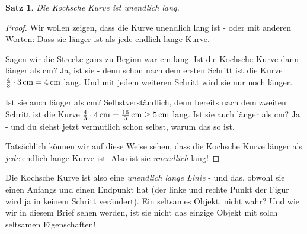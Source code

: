 \documentclass[a4paper,ngerman,12pt]{scrartcl}
\theoremstyle{definition}
\theoremstyle{plain}
\newtheorem{satz}[defn]{Satz}
\theoremstyle{remark}
\begin{document}
\begin{satz}\label{satz:Kochkurve_laenge}
Die Kochsche Kurve ist unendlich lang.
\end{satz} 

\begin{proof}
Wir wollen zeigen, dass die Kurve unendlich lang ist - oder mit anderen Worten: Dass sie länger ist als jede endlich lange Kurve.

Sagen wir die Strecke ganz zu Beginn war \unit[3]{cm} lang. Ist die Kochsche Kurve dann länger als \unit[4]{cm}? Ja, ist sie - denn schon nach dem ersten Schritt ist die Kurve $\frac{4}{3}\cdot\unit[3]{cm} = \unit[4]{cm}$ lang. Und mit jedem weiteren Schritt wird sie nur noch länger. 

Ist sie auch länger als \unit[5]{cm}? Selbstverständlich, denn bereits nach dem zweiten Schritt ist die Kurve $\frac{4}{3}\cdot\unit[4]{cm} = \unit[\frac{16}{3}]{cm}\geq  \unit[5]{cm}$ lang. Ist sie auch länger als \unit[6]{cm}? Ja - und du siehst jetzt vermutlich schon selbst, warum das so ist. 

Tatsächlich können wir auf diese Weise sehen, dass die Kochsche Kurve länger als \emph{jede} endlich lange Kurve ist. Also ist sie \emph{unendlich} lang!
\end{proof}

Die Kochsche Kurve ist also eine \emph{unendlich lange Linie} - und das, obwohl sie einen Anfangs und einen Endpunkt hat (der linke und rechte Punkt der Figur wird ja in keinem Schritt verändert). Ein seltsames Objekt, nicht wahr? Und wie wir in diesem Brief sehen werden, ist sie nicht das einzige Objekt mit solch seltsamen Eigenschaften!
\end{document}
